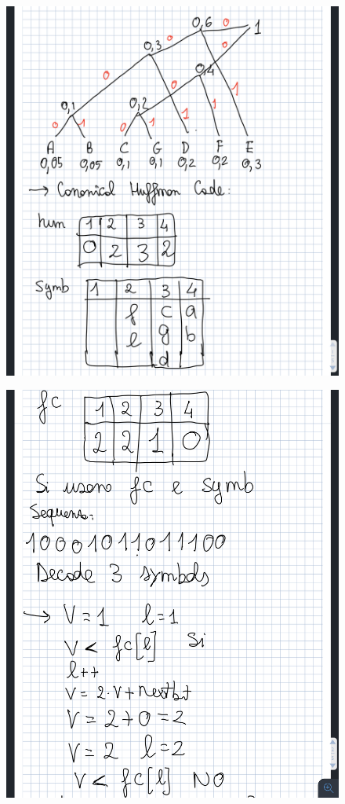 \documentclass[14pt]{extreport}
\begin{document}
\begin{figure}[H]
\centering
  \includegraphics[width=0.7\linewidth]{IMG_0171.jpg}

\end{figure}
\begin{figure}[H]
\centering
  \includegraphics[width=0.7\linewidth]{IMG_0172.jpg}

\end{figure}
\end{document}
